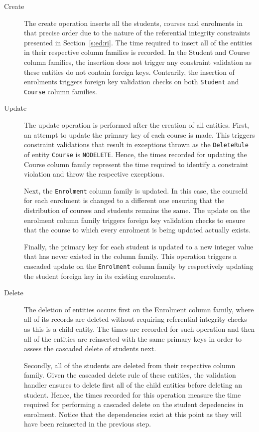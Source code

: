 	\begin{description}
	
		\item[Create] The create operation inserts all the students, courses and enrolments in
		that precise order due to the nature of the referential integrity constraints
		presented in Section~\ref{s:ed:ri}. The time required to insert all of the
		entities in their respective column families  is recorded. In the Student and
		Course column families, the insertion does not trigger any constraint validation
		as these entities do not contain foreign keys. Contrarily, the insertion of
		enrolments triggers foreign key validation checks on both \texttt{Student} and
		\texttt{Course} column families.
		
		\item[Update] The update operation is performed after the creation of all
		entities.
		First, an attempt to update the primary key of each course is made. This
		triggers constraint validations that result in exceptions thrown as the
		\texttt{DeleteRule} of entity \texttt{Course} is \texttt{NODELETE}. Hence, the
		times recorded for updating the Course column family represent the time required
		to identify a constraint violation and throw the respective exceptions.
					
		Next, the \texttt{Enrolment} column family is updated. In this case, the
		courseId for each enrolment is changed to a different one ensuring that the distribution of
		courses and students remains the same. The update on the enrolment column family
		triggers foreign key validation checks to ensure that the course to which every
		enrolment is being updated actually exists.
					
		Finally, the primary key for each student is updated to a new integer value that
		has never existed in the column family. This operation triggers a cascaded
		update on the \texttt{Enrolment} column family by respectively updating the
		student foreign key in its existing enrolments.
		
		\item[Delete]The deletion of entities occurs first on the Enrolment column family,
		where all of its records are deleted without requiring referential integrity
		checks as this is a child entity. The times are recorded for such operation and
		then all of the entities are reinserted with the same primary keys in order to
		 assess the cascaded delete of students next.
				
		Secondly, all of the students are deleted from their respective column family.
		Given the cascaded delete rule of these entities, the validation handler ensures
		to delete first all of the child entities before deleting an student. Hence, the
		times recorded for this operation measure the time required for performing a
		cascaded delete on the student depedencies in enrolment. Notice that the
		dependencies exist at this point as they will have been reinserted in the
		previous step.
				

\end{description}
